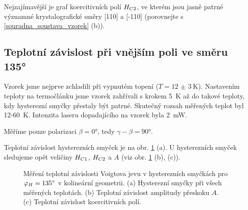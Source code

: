 Nejzajímavější je graf koercitivních polí $H_{C2}$, ve kterém jsou jasně patrné významné krystalografické směry [110] a [-110] (porovnejte s \ref{souradna_soustava_vzorek} (b)).



\subsection{Teplotní závislost při vnějším poli ve směru \ang{135}}

Vzorek jsme nejprve zchladili při vypnutém topení ($T=\SI{12(3)}{\kelvin}$). Nastavením teploty na termočlánku jsme vzorek zahřívali s krokem \SI{5}{\kelvin} až do takové teploty, kdy hysterezní smyčky přestaly být patrné. Skutečný rozsah měřených teplot byl 12-\SI{60}{\kelvin}. Intenzita laseru dopadajícího na vzorek byla \SI{2}{\milli\watt}.

Měříme pouze polarizaci $\beta=\ang{0}$, tedy $\gamma-\beta=\ang{90}$.

Teplotní závislost hysterezních smyček je na obr. \ref{kol_vysl_tep_voigt} (a). U hysterezních smyček sledujeme opět veličiny $H_{C1}$, $H_{C2}$ a $A$ (viz obr. \ref{kol_vysl_tep_voigt} (b), (c)).


\begin{figure}[htbp]\centering
{}
	\caption{Měření teplotní závislosti Voigtova jevu v hysterezních smyčkách pro $\varphi_H=\ang{135}$ v kolineární geometrii. (a) Hysterezní smyčky při všech měřených teplotách. (b) Teplotní závislost amplitudy přeskoku $A$. (c) Teplotní závislost koercitivních polí.}\label{kol_vysl_tep_voigt}
\end{figure}
